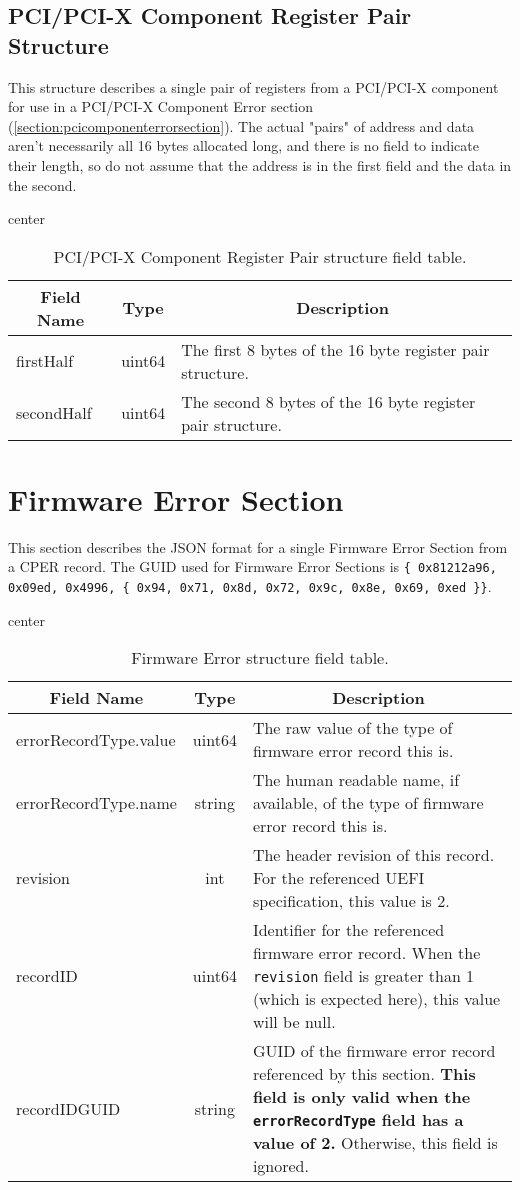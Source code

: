 \documentclass{report}
\newcommand*{\thead}[1]{\multicolumn{1}{|c|}{\bfseries #1}}
\newcommand*{\jsontable}[1]{
    \begin{table}[!ht]
    \label{#1}
    \centering
    \begin{adjustbox}{center}
    \begin{tabular}{|l|c|p{8cm}|}
    \hline
    \thead{Field Name} & \thead{Type} & \thead{Description} \\
    \hline
}
\newcommand*{\jsontableend}[1]{
    \hline
    \end{tabular}
    \end{adjustbox}
    \caption{#1}
    \label{table:#1}
    \end{table}
    \FloatBarrier
}
\begin{document}
\subsection{PCI/PCI-X Component Register Pair Structure}
\label{subsection:pcicomponentregisterpairstructure}
This structure describes a single pair of registers from a PCI/PCI-X component for use in a PCI/PCI-X Component Error section (\ref{section:pcicomponenterrorsection}). The actual "pairs" of address and data aren't necessarily all 16 bytes allocated long, and there is no field to indicate their length, so do not assume that the address is in the first field and the data in the second.
\jsontable{table:pcicomponentregisterpairstructure}
firstHalf & uint64 & The first 8 bytes of the 16 byte register pair structure.\\
\hline
secondHalf & uint64 & The second 8 bytes of the 16 byte register pair structure.\\
\jsontableend{PCI/PCI-X Component Register Pair structure field table.}

\section{Firmware Error Section}
\label{section:firmwareerrorsection}
This section describes the JSON format for a single Firmware Error Section from a CPER record. The GUID used for Firmware Error Sections is \texttt{\{ 0x81212a96, 0x09ed, 0x4996, \{ 0x94, 0x71, 0x8d, 0x72, 0x9c, 0x8e, 0x69, 0xed \}\}}.
\jsontable{table:firmwareerrorsection}
errorRecordType.value & uint64 & The raw value of the type of firmware error record this is.\\
errorRecordType.name & string & The human readable name, if available, of the type of firmware error record this is.\\
\hline
revision & int & The header revision of this record. For the referenced UEFI specification, this value is 2.\\
\hline
recordID & uint64 & Identifier for the referenced firmware error record. When the \texttt{revision} field is greater than 1 (which is expected here), this value will be null.\\
\hline
recordIDGUID & string & GUID of the firmware error record referenced by this section. \textbf{This field is only valid when the \texttt{errorRecordType} field has a value of 2.} Otherwise, this field is ignored.\\
\jsontableend{Firmware Error structure field table.}
\end{document}
